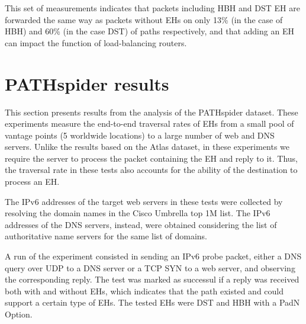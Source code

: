 \documentclass[conference]{IEEEtran}
\begin{document}
This set of measurements indicates that packets including HBH and DST EH are forwarded the same way as packets without EHs on only 13\% (in the case of HBH) and 60\% (in the case DST) of paths respectively, and that adding an EH can impact the function of load-balancing routers.
 
\section{PATHspider results} 
\label{sec:pathspider-results}

This section presents results from the analysis of the PATHspider dataset.
These experiments measure the end-to-end traversal rates of EHs from a small
pool of vantage points (5 worldwide locations) to a large number of web and
DNS servers.  Unlike the results based on the Atlas dataset, in these
experiments we require the server to process the packet containing the EH and
reply to it. Thus, the traversal rate in these tests also accounts for the ability
of the destination to process an EH.

The IPv6 addresses of the target web servers in these tests were collected by
resolving the domain names in the Cisco Umbrella top 1M list. The IPv6
addresses of the DNS servers, instead, were obtained considering the list of
authoritative name servers for the same list of domains.

A run of the experiment consisted in sending an IPv6 probe packet, either a DNS
query over UDP to a DNS server or a TCP SYN to a web server, and observing the
corresponding reply.  The test was marked as successul if a reply was received
both with and without EHs, which indicates that the path existed and could
support a certain type of EHs.  The tested EHs were DST and HBH with a PadN Option.

\end{document}
